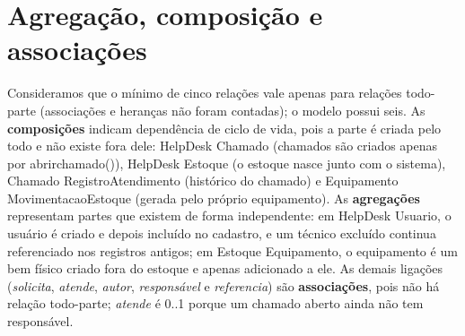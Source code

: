 \documentclass[12pt]{article}
\newcommand{\brk}{\textunderscore\allowbreak}
\newcommand{\cod}[1]{{\small\ttfamily\let\_\brk #1}}
\begin{document}
\section{Agregação, composição e associações}

Consideramos que o mínimo de cinco relações vale apenas para relações todo-parte (associações e heranças não foram contadas); o modelo possui seis. As \textbf{composições} indicam dependência de ciclo de vida, pois a parte é criada pelo todo e não existe fora dele: \cod{HelpDesk} \cod{Chamado} (chamados são criados apenas por \cod{abrir\_chamado()}), \cod{HelpDesk} \cod{Estoque} (o estoque nasce junto com o sistema), \cod{Chamado} \cod{RegistroAtendimento} (histórico do chamado) e \cod{Equipamento} \cod{MovimentacaoEstoque} (gerada pelo próprio equipamento). As \textbf{agregações} representam partes que existem de forma independente: em \cod{HelpDesk} \cod{Usuario}, o usuário é criado e depois incluído no cadastro, e um técnico excluído continua referenciado nos registros antigos; em \cod{Estoque} \cod{Equipamento}, o equipamento é um bem físico criado fora do estoque e apenas adicionado a ele. As demais ligações (\textit{solicita}, \textit{atende}, \textit{autor}, \textit{responsável} e \textit{referencia}) são \textbf{associações}, pois não há relação todo-parte; \textit{atende} é 0..1 porque um chamado aberto ainda não tem responsável.
\end{document}
